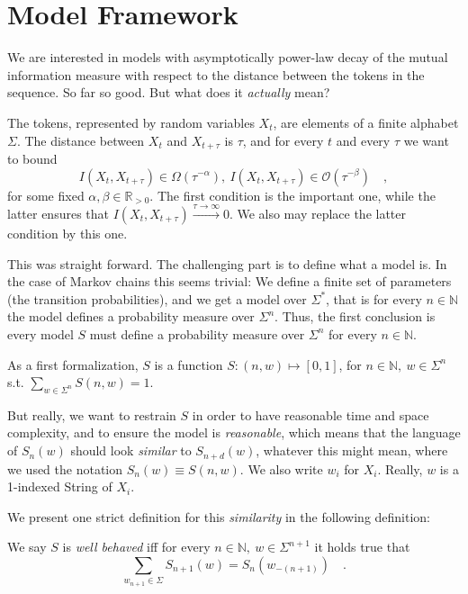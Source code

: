 \documentclass[../../main.tex]{subfiles}
\begin{document}
\section{Model Framework}
    We are interested in models with asymptotically power-law decay of the mutual information measure with respect to the distance between the tokens in the sequence. So far so good. But what does it \emph{actually} mean?

    The tokens, represented by random variables $X_t$, are elements of a finite alphabet $\Sigma$. The distance between $X_t$ and $X_{t + \tau}$ is $\tau$, and for every $t$ and every $\tau$ we want to bound
    \[
        I(X_t, X_{t + \tau}) \in \Omega(\tau^{-\alpha}), \ I(X_t, X_{t + \tau}) \in \mathcal{O}(\tau^{-\beta}) \quad ,
    \]
    for some fixed $\alpha, \beta \in \mathbb{R}_{>0}$. The first condition is the important one, while the latter ensures that $I(X_t, X_{t + \tau}) \xrightarrow{\tau \to \infty} 0$. We also may replace the latter condition by this one.

    This was straight forward. The challenging part is to define what a  model is. In the case of Markov chains this seems trivial: We define a finite set of parameters (the transition probabilities), and we get a model over $\Sigma^*$, that is for every $n \in \mathbb{N}$ the model defines a probability measure over $\Sigma^n$. Thus, the first conclusion is every model $S$ must define a probability measure over $\Sigma^n$ for every $n\in \mathbb{N}$.

    As a first formalization, $S$ is a function $S: (n, w) \mapsto [0, 1]$, for $n \in \mathbb{N}, \ w \in \Sigma^n$ s.t. $\sum_{w \in \Sigma^n} S(n, w) = 1$.

    But really, we want to restrain $S$ in order to have reasonable time and space complexity, and to ensure the model is \emph{reasonable}, which means that the language of $S_n(w)$ should look \emph{similar} to $S_{n + d}(w)$, whatever this might mean, where we used the notation $S_n(w) \equiv S(n, w)$. We also write $w_i$ for $X_i$. Really, $w$ is a 1-indexed String of $X_i$.  

    We present one strict definition for this \emph{similarity} in the following definition:

    \begin{definition}
        We say $S$ is \emph{well behaved} iff for every $n \in \mathbb{N}, \ w \in \Sigma^{n + 1}$ it holds true that
        \[
            \sum_{w_{n + 1} \in \Sigma} S_{n + 1}(w) = S_n(w_{-(n + 1)}) \quad .
        \]
    \end{definition}
\end{document}

